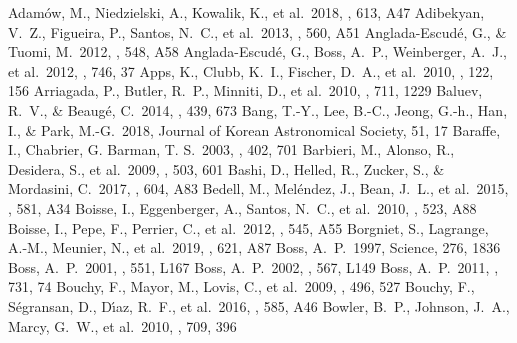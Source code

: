 \documentclass[twocolumn]{aastex62}
\begin{document}
\begin{CJK*}{UTF8}{min}
\begin{thebibliography}{}

 Adam{\'o}w, M., Niedzielski, A., Kowalik, K., et al.\ 2018, \aap, 613, A47
 Adibekyan, V.~Z., Figueira, P., Santos, N.~C., et al.\ 2013, \aap, 560, A51
 Anglada-Escud{\'e}, G., \& Tuomi, M.\ 2012, \aap, 548, A58
 Anglada-Escud{\'e}, G., Boss, A.~P., Weinberger, A.~J., et al.\ 2012, \apj, 746, 37
 Apps, K., Clubb, K.~I., Fischer, D.~A., et al.\ 2010, \pasp, 122, 156
 Arriagada, P., Butler, R.~P., Minniti, D., et al.\ 2010, \apj, 711, 1229
 Baluev, R.~V., \& Beaug{\'e}, C.\ 2014, \mnras, 439, 673
 Bang, T.-Y., Lee, B.-C., Jeong, G.-h., Han, I., \& Park, M.-G.\ 2018, Journal of Korean Astronomical Society, 51, 17
 Baraffe, I., Chabrier, G. Barman, T. S.\ 2003, \aap, 402, 701
 Barbieri, M., Alonso, R., Desidera, S., et al.\ 2009, \aap, 503, 601
 Bashi, D., Helled, R., Zucker, S., \& Mordasini, C.\ 2017, \aap, 604, A83
 Bedell, M., Mel{\'e}ndez, J., Bean, J.~L., et al.\ 2015, \aap, 581, A34
 Boisse, I., Eggenberger, A., Santos, N.~C., et al.\ 2010, \aap, 523, A88
 Boisse, I., Pepe, F., Perrier, C., et al.\ 2012, \aap, 545, A55
 Borgniet, S., Lagrange, A.-M., Meunier, N., et al.\ 2019, \aap, 621, A87
 Boss, A.~P.\ 1997, Science, 276, 1836
 Boss, A.~P.\ 2001, \apjl, 551, L167
 Boss, A.~P.\ 2002, \apjl, 567, L149
 Boss, A.~P.\ 2011, \apj, 731, 74
 Bouchy, F., Mayor, M., Lovis, C., et al.\ 2009, \aap, 496, 527
 Bouchy, F., S{\'e}gransan, D., D{\'{\i}}az, R.~F., et al.\ 2016, \aap, 585, A46
 Bowler, B.~P., Johnson, J.~A., Marcy, G.~W., et al.\ 2010, \apj, 709, 396

\end{thebibliography}
\end{CJK*}
\end{document}
